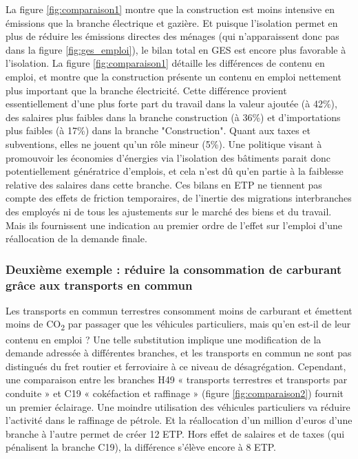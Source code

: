 La figure \ref{fig:comparaison1} montre que la construction est moins intensive en émissions que la branche électrique et gazière. Et puisque l’isolation permet en plus de réduire les émissions directes des ménages (qui n’apparaissent donc pas dans la figure \ref{fig:ges_emploi}), le bilan total en GES est encore plus favorable à l’isolation. 
La figure \ref{fig:comparaison1} détaille les différences de contenu en emploi, et montre que la construction présente un contenu en emploi nettement plus important que la branche électricité. 
Cette différence provient essentiellement d'une plus forte part du travail dans la valeur ajoutée (à 42\%), des salaires plus faibles dans la branche construction (à 36\%) et d'importations plus faibles (à 17\%) dans la branche "Construction". Quant aux taxes et subventions, elles ne jouent qu’un rôle mineur (5\%). 
Une politique visant à promouvoir les économies d’énergies via l’isolation des bâtiments parait donc potentiellement génératrice d’emplois, et cela n’est dû qu’en partie à la faiblesse relative des salaires dans cette branche. 
Ces bilans en ETP ne tiennent pas compte des effets de friction temporaires, de l’inertie des migrations interbranches des employés \citep{Duhautois2005} ni de tous les ajustements sur le marché des biens et du travail. Mais ils fournissent une indication au premier ordre de l’effet sur l’emploi d’une réallocation de la demande finale.

\subsubsection{Deuxième exemple : réduire la consommation de carburant grâce aux  transports en commun}

Les transports en commun terrestres consomment moins de carburant et émettent moins de CO\textsubscript{2} par passager que les véhicules particuliers, mais qu’en est-il de leur contenu en emploi ? Une telle substitution implique une modification de la demande adressée à différentes branches, et les transports en commun ne sont pas distingués du fret routier et ferroviaire à ce niveau de désagrégation. 
Cependant, une comparaison entre les branches H49 « transports terrestres et transports par conduite » et C19 « cokéfaction et raffinage » (figure \ref{fig:comparaison2}) fournit un premier éclairage. Une moindre utilisation des véhicules particuliers va réduire l’activité dans le raffinage de pétrole. Et la réallocation d’un million d’euros d’une branche à l’autre permet de créer 12 ETP. Hors effet de salaires et de taxes (qui pénalisent la branche C19), la différence s’élève encore à 8 ETP.

